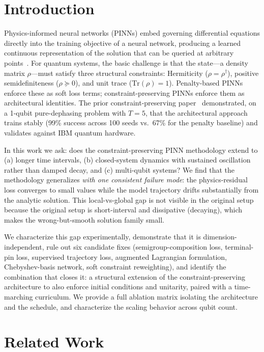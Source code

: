 \documentclass[11pt]{article}
\begin{document}
\section{Introduction}

Physics-informed neural networks (PINNs) embed governing differential equations directly into the training objective of a neural network, producing a learned continuous representation of the solution that can be queried at arbitrary points~\cite{raissi2019}. For quantum systems, the basic challenge is that the state---a density matrix $\rho$---must satisfy three structural constraints: Hermiticity ($\rho = \rho^\dagger$), positive semidefiniteness ($\rho \succeq 0$), and unit trace ($\mathrm{Tr}(\rho) = 1$). Penalty-based PINNs enforce these as soft loss terms; constraint-preserving PINNs enforce them as architectural identities. The prior constraint-preserving paper~\cite{hangen2024constraint} demonstrated, on a 1-qubit pure-dephasing problem with $T = 5$, that the architectural approach trains stably (99\% success across 100 seeds vs.\ 67\% for the penalty baseline) and validates against IBM quantum hardware.

In this work we ask: does the constraint-preserving PINN methodology extend to (a) longer time intervals, (b) closed-system dynamics with sustained oscillation rather than damped decay, and (c) multi-qubit systems? We find that the methodology generalizes \emph{with one consistent failure mode}: the physics-residual loss converges to small values while the model trajectory drifts substantially from the analytic solution. This local-vs-global gap is not visible in the original setup because the original setup is short-interval and dissipative (decaying), which makes the wrong-but-smooth solution family small.

We characterize this gap experimentally, demonstrate that it is dimension-independent, rule out six candidate fixes (semigroup-composition loss, terminal-pin loss, supervised trajectory loss, augmented Lagrangian formulation, Chebyshev-basis network, soft constraint reweighting), and identify the combination that closes it: a structural extension of the constraint-preserving architecture to also enforce initial conditions and unitarity, paired with a time-marching curriculum. We provide a full ablation matrix isolating the architecture and the schedule, and characterize the scaling behavior across qubit count.

\section{Related Work}
\end{document}
